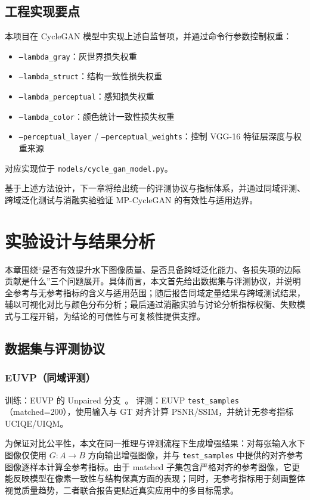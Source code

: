 \documentclass[a4paper,zihao=-4,linespread=1.25]{ctexart}
\begin{document}
\subsection{工程实现要点}
本项目在 CycleGAN 模型中实现上述自监督项，并通过命令行参数控制权重：
\begin{itemize}
    \item \texttt{--lambda\_gray}：灰世界损失权重
    \item \texttt{--lambda\_struct}：结构一致性损失权重
    \item \texttt{--lambda\_perceptual}：感知损失权重
    \item \texttt{--lambda\_color}：颜色统计一致性损失权重
    \item \texttt{--perceptual\_layer} / \texttt{--perceptual\_weights}：控制 VGG-16 特征层深度与权重来源
\end{itemize}
对应实现位于 \texttt{models/cycle\_gan\_model.py}。

基于上述方法设计，下一章将给出统一的评测协议与指标体系，并通过同域评测、跨域泛化测试与消融实验验证 MP-CycleGAN 的有效性与适用边界。

\section{实验设计与结果分析}

本章围绕“是否有效提升水下图像质量、是否具备跨域泛化能力、各损失项的边际贡献是什么”三个问题展开。具体而言，本文首先给出数据集与评测协议，并说明全参考与无参考指标的含义与适用范围；随后报告同域定量结果与跨域测试结果，辅以可视化对比与颜色分布分析；最后通过消融实验与讨论分析指标权衡、失败模式与工程开销，为结论的可信性与可复核性提供支撑。

\subsection{数据集与评测协议}
\subsubsection{EUVP（同域评测）}
训练：EUVP 的 Unpaired 分支~\cite{2}。
评测：EUVP \texttt{test\_samples}（matched=200），使用输入与 GT 对齐计算 PSNR/SSIM，并统计无参考指标 UCIQE/UIQM。

为保证对比公平性，本文在同一推理与评测流程下生成增强结果：对每张输入水下图像仅使用 $G: A\to B$ 方向输出增强图像，并与 \texttt{test\_samples} 中提供的对齐参考图像逐样本计算全参考指标。由于 matched 子集包含严格对齐的参考图像，它更能反映模型在像素一致性与结构保真方面的表现；同时，无参考指标用于刻画整体视觉质量趋势，二者联合报告更贴近真实应用中的多目标需求。
\end{document}

